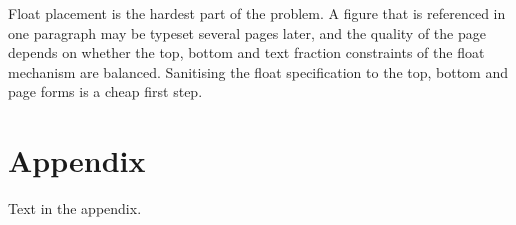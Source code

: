\documentclass[10pt,a4paper,fleqn]{article}
\begin{document}
Float placement is the hardest part of the problem. A figure that is referenced in one paragraph may be typeset several pages later, and the quality of the page depends on whether the top, bottom and text fraction constraints of the float mechanism are balanced. Sanitising the float specification to the top, bottom and page forms is a cheap first step.


\section*{Appendix}
Text in the appendix.
\end{document}
